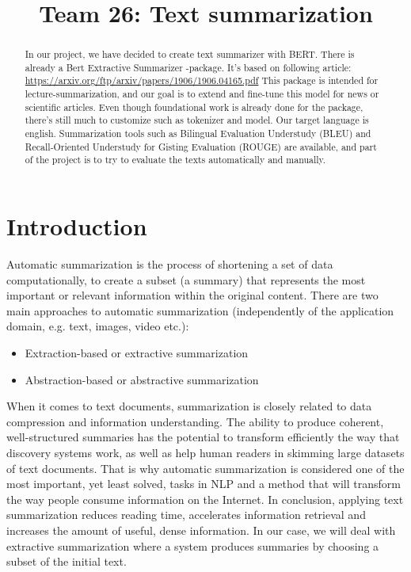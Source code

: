\documentclass{article}
\title{Team 26: Text summarization}
\begin{document}
	
\maketitle
\maketitle

\begin{abstract}
	\noindent
	In our project, we have decided to create text summarizer with BERT. 
	There is already a Bert Extractive Summarizer -package. It's based on following article: \href{https://arxiv.org/ftp/arxiv/papers/1906/1906.04165.pdf}{https://arxiv.org/ftp/arxiv/papers/1906/1906.04165.pdf}
	This package is intended for lecture-summarization, and our goal is to extend and fine-tune this model for news or scientific articles.
	Even though foundational work is already done for the package, there's still much to customize such as tokenizer and model. 
	Our target language is english. Summarization tools such as Bilingual Evaluation Understudy (BLEU) and Recall-Oriented Understudy for Gisting Evaluation (ROUGE) are available, and part of the project is to try to evaluate the texts automatically and manually.	
\end{abstract}

\clearpage
\section{Introduction}
Automatic summarization is the process of shortening a set of data computationally, to create a subset (a summary) that represents the most important or relevant information within the original content. There are two main approaches to automatic summarization (independently of the application domain, e.g. text, images, video etc.):
\begin{itemize}
	\item Extraction-based or extractive summarization 
	\item Abstraction-based or abstractive summarization
\end{itemize}

When it comes to text documents, summarization is closely related to data compression and information understanding. The ability to produce coherent, well-structured summaries has the potential to transform efficiently the way that discovery systems work, as well as help human readers in skimming large datasets of text documents. That is why automatic summarization is considered one of the most important, yet least solved, tasks in NLP and a method that will transform the way people consume information on the Internet. In conclusion, applying text summarization reduces reading time, accelerates information retrieval and increases the amount of useful, dense information. In our case, we will deal with extractive summarization where a system produces summaries by choosing a subset of the initial text.
\end{document}
